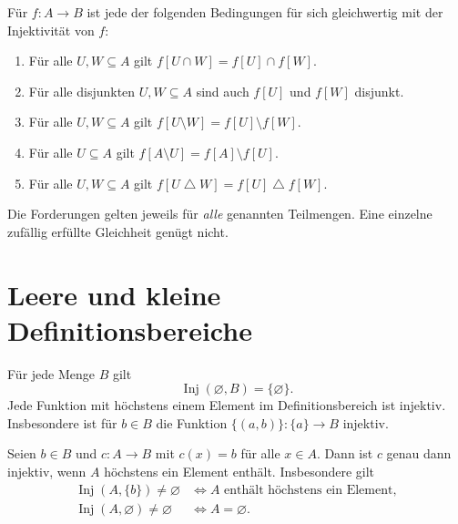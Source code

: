 \begin{theorem}
\label{b06guide:thm:operationcriteria}
Für $f\colon A\to B$ ist jede der folgenden Bedingungen
für sich gleichwertig mit der Injektivität von $f$:
\begin{enumerate}
\item Für alle $U,W\subseteq A$ gilt
      $f[U\cap W]=f[U]\cap f[W]$.
\item Für alle disjunkten $U,W\subseteq A$ sind
      auch $f[U]$ und $f[W]$ disjunkt.
\item Für alle $U,W\subseteq A$ gilt
      $f[U\setminus W]=f[U]\setminus f[W]$.
\item Für alle $U\subseteq A$ gilt
      $f[A\setminus U]=f[A]\setminus f[U]$.
\item Für alle $U,W\subseteq A$ gilt
      $f[U\mathbin{\triangle}W]=f[U]\mathbin{\triangle}f[W]$.
\end{enumerate}
Die Forderungen gelten jeweils für \emph{alle} genannten
Teilmengen. Eine einzelne zufällig erfüllte Gleichheit genügt nicht.
\end{theorem}

\section{Leere und kleine Definitionsbereiche}

\begin{theorem}
\label{b06guide:thm:empty}
Für jede Menge $B$ gilt
\[
 \operatorname{Inj}(\varnothing,B)=\{\varnothing\}.
\]
Jede Funktion mit höchstens einem Element im Definitionsbereich
ist injektiv. Insbesondere ist für $b\in B$ die Funktion
$\{(a,b)\}\colon\{a\}\to B$ injektiv.
\end{theorem}

\begin{theorem}
\label{b06guide:thm:constant}
Seien $b\in B$ und $c\colon A\to B$ mit $c(x)=b$ für alle $x\in A$.
Dann ist $c$ genau dann injektiv, wenn $A$ höchstens ein Element
enthält. Insbesondere gilt
\[
 \begin{aligned}
 \operatorname{Inj}(A,\{b\})\ne\varnothing
   &\Longleftrightarrow A\text{ enthält höchstens ein Element},\\
 \operatorname{Inj}(A,\varnothing)\ne\varnothing
   &\Longleftrightarrow A=\varnothing.
 \end{aligned}
\]
\end{theorem}